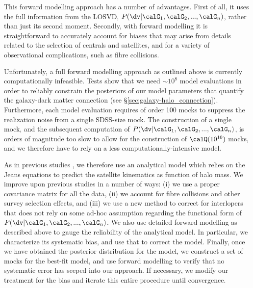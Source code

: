 \documentclass[fleqn,usenatbib,useAMS]{mnras}
\begin{document}
	This forward modelling approach has a number of advantages. First of all, it uses the full information from the LOSVD, $P(\dv |\calG_1, \calG_2,...,\calG_n)$, rather than just its second moment. Secondly, with forward modelling it is straightforward to accurately account for biases that may arise from details related to the selection of centrals and satellites, and for a variety of observational complications, such as fibre collisions.
	
	Unfortunately, a full forward modelling approach as outlined above is currently computationally infeasible. Tests show that we need $\sim 10^8$ model evaluations in order to reliably constrain the posteriors of our model parameters that quantify the galaxy-dark matter connection (see \S\ref{sec:galaxy-halo_connection}). Furthermore, each model evaluation requires of order 100 mocks to suppress the realization noise from a single SDSS-size mock. The construction of a single mock, and the subsequent computation of $P(\dv |\calG_1, \calG_2,...,\calG_n)$, is orders of magnitude too slow to allow for the construction of $\calQ(10^{10})$ mocks, and we therefore have to rely on a less computationally-intensive model.
	
	As in previous studies \citep[e.g][]{vdBosch+04, More+09b, More+11, Wojtak+13}, we therefore use an analytical model which relies on the Jeans equations to predict the satellite kinematics as function of halo mass. We improve upon previous studies in a number of ways: (i) we use a proper covariance matrix for all the data,  (ii) we account for fibre collisions and other survey selection effects, and (iii) we use a new method to correct for interlopers that does not rely on some ad-hoc assumption regarding the functional form of $P(\dv |\calG_1, \calG_2,...,\calG_n)$. We also use detailed forward modelling as described above to gauge the reliability of the analytical model. In particular, we characterize its systematic bias, and use that to correct the model. Finally, once we have obtained the posterior distribution for the model, we construct a set of mocks for the best-fit model, and use forward modelling to verify that no systematic error has seeped into our approach. If necessary, we modify our treatment for the bias and iterate this entire procedure until convergence.
	
\end{document}
